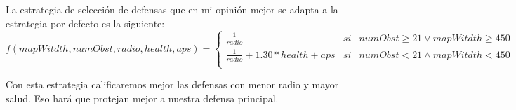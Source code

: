 La estrategia de selección de defensas que en mi opinión mejor se adapta a la estrategia por defecto es la siguiente:
$$f(mapWitdth, numObst, radio, health, aps)=\left\{ 
  \begin{array}{lcr}
    \frac{1}{radio} & si &numObst \geq 21 \vee mapWitdth \geq 450  \\ %
    \frac{1}{radio} + 1.30 * health + aps & si&  numObst < 21 \wedge mapWitdth < 450 \\ %
  \end{array}
\right.$$

Con esta estrategia calificaremos mejor las defensas con menor radio y mayor salud. Eso hará que protejan mejor a nuestra defensa principal.